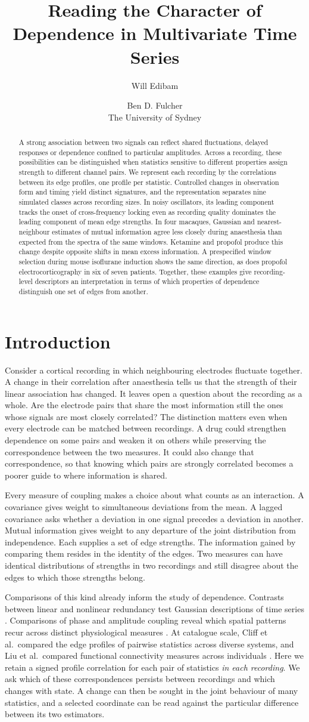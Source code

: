 \documentclass[pdflatex,sn-nature,iicol]{sn-jnl}
\title[Dependence profiles]{Reading the Character of Dependence in Multivariate Time Series}
\author*[1]{\fnm{Will} \sur{Edibam}}\email{will.edibam@sydney.edu.au}
\author[1]{\fnm{Ben D.} \sur{Fulcher}}
\affil*[1]{\orgdiv{School of Physics}, \orgname{The University of Sydney}, \orgaddress{\city{Sydney}, \state{NSW}, \country{Australia}}}
\author[W. Edibam and B. D. Fulcher]{%
  Will Edibam \and Ben D. Fulcher \\
  The University of Sydney \\
  \email{will.edibam@sydney.edu.au}
  }
\newcommand{\abstracttext}{%
A strong association between two signals can reflect shared fluctuations, delayed responses or dependence confined to particular amplitudes. Across a recording, these possibilities can be distinguished when statistics sensitive to different properties assign strength to different channel pairs. We represent each recording by the correlations between its edge profiles, one profile per statistic. Controlled changes in observation form and timing yield distinct signatures, and the representation separates nine simulated classes across recording sizes. In noisy oscillators, its leading component tracks the onset of cross-frequency locking even as recording quality dominates the leading component of mean edge strengths. In four macaques, Gaussian and nearest-neighbour estimates of mutual information agree less closely during anaesthesia than expected from the spectra of the same windows. Ketamine and propofol produce this change despite opposite shifts in mean excess information. A prespecified window selection during mouse isoflurane induction shows the same direction, as does propofol electrocorticography in six of seven patients. Together, these examples give recording-level descriptors an interpretation in terms of which properties of dependence distinguish one set of edges from another.%
}
\begin{document}
\maketitle
\ifnature\else
  \suppressfloats[t] %
  \begin{abstract}
  \abstracttext
  \end{abstract}
\fi

\section{Introduction}

Consider a cortical recording in which neighbouring electrodes fluctuate together. A change in their correlation after anaesthesia tells us that the strength of their linear association has changed. It leaves open a question about the recording as a whole. Are the electrode pairs that share the most information still the ones whose signals are most closely correlated? The distinction matters even when every electrode can be matched between recordings. A drug could strengthen dependence on some pairs and weaken it on others while preserving the correspondence between the two measures. It could also change that correspondence, so that knowing which pairs are strongly correlated becomes a poorer guide to where information is shared.

Every measure of coupling makes a choice about what counts as an interaction. A covariance gives weight to simultaneous deviations from the mean. A lagged covariance asks whether a deviation in one signal precedes a deviation in another. Mutual information gives weight to any departure of the joint distribution from independence. Each supplies a set of edge strengths. The information gained by comparing them resides in the identity of the edges. Two measures can have identical distributions of strengths in two recordings and still disagree about the edges to which those strengths belong.

Comparisons of this kind already inform the study of dependence. Contrasts between linear and nonlinear redundancy test Gaussian descriptions of time series \cite{palus1995testing,hlinka2011functional}. Comparisons of phase and amplitude coupling reveal which spatial patterns recur across distinct physiological measures \cite{mostame2020phase,siems2020dissociated}. At catalogue scale, Cliff et al.\ compared the edge profiles of pairwise statistics across diverse systems, and Liu et al.\ compared functional connectivity measures across individuals \cite{cliff2023unifying,liu2025benchmarking}. Here we retain a signed profile correlation for each pair of statistics \emph{in each recording}. We ask which of these correspondences persists between recordings and which changes with state. A change can then be sought in the joint behaviour of many statistics, and a selected coordinate can be read against the particular difference between its two estimators.
\end{document}

